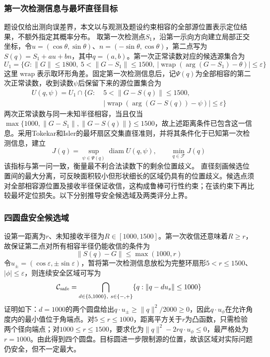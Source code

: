 \subsubsection{第一次检测信息与最坏直径目标}
题设仅给出测向误差界，本文以与观测及题设约束相容的全部源位置表示定位结果，不额外指定其概率分布。
取第一次检测点$S_1$，沿第一示向方向建立局部正交坐标，令$u=(\cos\theta,\sin\theta)$、$n=(-\sin\theta,\cos\theta)$，第二点写为$S(q)=S_1+a u+b n$，其中$q=(a,b)$。第一次正常读数对应的候选源集合为
\begin{equation}
 U_1=\{G:\|G\|\le1800,\ 5<\|G-S_1\|\le1500,
 \ |\operatorname{wrap}(\arg(G-S_1)-\theta)|\le\varepsilon\}
\end{equation}
这里$\operatorname{wrap}$表示取环形角差。固定第一次检测信息后，记$\Psi(q)$为全部相容的第二次正常读数，收到读数$\psi$后保留下来的源位置集合为
\begin{equation}
 \begin{aligned}
 U(q,\psi)=U_1\cap\{G:\;&5<\|G-S(q)\|\le1500,\\
 &|\operatorname{wrap}(\arg(G-S(q))-\psi)|\le\varepsilon\}
 \end{aligned}
\end{equation}
两次正常读数与同一未知半径相容，当且仅当$\max\{1000,\|G-S_1\|,\|G-S(q)\|\}\le1500$，故上述距离条件已包含这一信息。采用Tokekar和Isler的最坏扇区交集直径准则\cite{tokekar}，并将其条件化于已知第一次检测信息，建立
\begin{equation}
 J(q)=\sup_{\psi\in\Psi(q)}\operatorname{diam}U(q,\psi),\qquad
 \min_{q\in\mathcal F}J(q)
 \label{eq:p2_objective}
\end{equation}
该指标与第一问一致，衡量最不利合法读数下的剩余位置歧义。
直径刻画候选位置间的最大分离，可反映面积较小但形状细长的区域仍具有的位置歧义。候选点须对全部相容源位置及接收半径保证收信，这构成鲁棒可行性约束\cite{bertsimas2011}；在该约束下再比较最坏定位损失。以下分别推导安全候选域及两类评分上界。

\subsubsection{四圆盘安全候选域}
设第一距离为$r$、未知接收半径为$R\in[1000,1500]$。第一次收信还意味着$R\ge r$，故保证第二点对所有相容半径仍能收信的条件为
\begin{equation}
 \|S(q)-G\|\le\max(1000,r)
\end{equation}
令$u_\pm=(\cos\varepsilon,\pm\sin\varepsilon)$，暂将第一次检测信息放松为完整环扇形$5<r\le1500$、$|\phi|\le\varepsilon$，则连续安全区域可写为
\begin{equation}
 \mathcal C_{\rm safe}
 =\bigcap_{d\in\{5,1000\},\ s\in\{-,+\}}
 \{q:\|q-du_s\|\le1000\}
 \label{eq:four_disks}
\end{equation}
证明如下：$d=1000$的两个圆盘给出$q\cdot u_\pm\ge\|q\|^2/2000\ge0$，因此$q\cdot u_\phi$在允许角度内的最小值位于角端点。对$5\le r\le1000$，距离平方关于$r$为凸函数，只需检验两个径向端点；对$1000\le r\le1500$，要求化为$\|q\|^2-2r q\cdot u_\phi\le0$，最严格处为$r=1000$。由此得到四个圆盘。目标圆进一步限制源的位置，故该区域对实际问题仍安全，但不一定最大。

